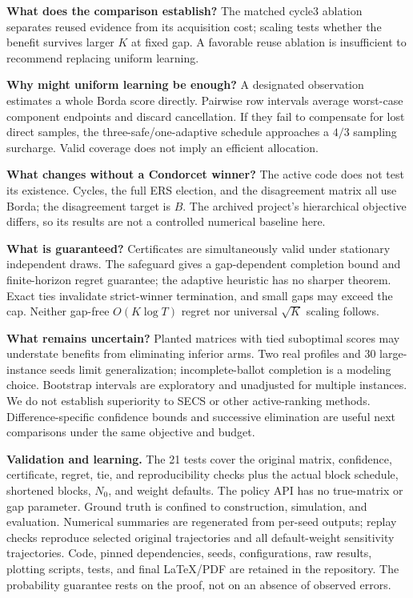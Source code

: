 \documentclass[11pt,a4paper]{article}
\begin{document}
\textbf{What does the comparison establish?} The matched cycle3 ablation separates reused evidence from its acquisition cost; scaling tests whether the benefit survives larger $K$ at fixed gap. A favorable reuse ablation is insufficient to recommend replacing uniform learning.

\textbf{Why might uniform learning be enough?} A designated observation estimates a whole Borda score directly. Pairwise row intervals average worst-case component endpoints and discard cancellation. If they fail to compensate for lost direct samples, the three-safe/one-adaptive schedule approaches a $4/3$ sampling surcharge. Valid coverage does not imply an efficient allocation.

\textbf{What changes without a Condorcet winner?} The active code does not test its existence. Cycles, the full ERS election, and the disagreement matrix all use Borda; the disagreement target is $B$. The archived project's hierarchical objective differs, so its results are not a controlled numerical baseline here.

\textbf{What is guaranteed?} Certificates are simultaneously valid under stationary independent draws. The safeguard gives a gap-dependent completion bound and finite-horizon regret guarantee; the adaptive heuristic has no sharper theorem. Exact ties invalidate strict-winner termination, and small gaps may exceed the cap. Neither gap-free $O(K\log T)$ regret nor universal $\sqrt K$ scaling follows.

\textbf{What remains uncertain?} Planted matrices with tied suboptimal scores may understate benefits from eliminating inferior arms. Two real profiles and 30 large-instance seeds limit generalization; incomplete-ballot completion is a modeling choice. Bootstrap intervals are exploratory and unadjusted for multiple instances. We do not establish superiority to SECS or other active-ranking methods. Difference-specific confidence bounds and successive elimination are useful next comparisons under the same objective and budget.

\textbf{Validation and learning.} The 21 tests cover the original matrix, confidence, certificate, regret, tie, and reproducibility checks plus the actual block schedule, shortened blocks, $N_0$, and weight defaults. The policy API has no true-matrix or gap parameter. Ground truth is confined to construction, simulation, and evaluation. Numerical summaries are regenerated from per-seed outputs; replay checks reproduce selected original trajectories and all default-weight sensitivity trajectories. Code, pinned dependencies, seeds, configurations, raw results, plotting scripts, tests, and final LaTeX/PDF are retained in the repository. The probability guarantee rests on the proof, not on an absence of observed errors.
\end{document}
